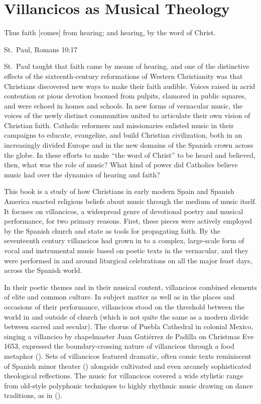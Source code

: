 
\chapter{Villancicos as Musical Theology}

\epigraph{%

Thus faith [comes] from hearing; and hearing, by the word of Christ.%
}{St.~Paul, Romans 10:17}


St.~Paul taught that faith came by means of hearing, and one of the distinctive effects of the sixteenth-century reformations of Western Christianity was that Christians discovered new ways to make their faith audible.
Voices raised in acrid contention or pious devotion boomed from pulpits, clamored in public squares, and were echoed in homes and schools.
In new forms of vernacular music, the voices of the newly distinct communities united to articulate their own vision of Christian faith.
Catholic reformers and missionaries enlisted music in their campaigns to educate, evangelize, and build Christian civilization, both in an increasingly divided Europe and in the new domains of the Spanish crown across the globe. 
In these efforts to make \enquote{the word of Christ} to be heard and believed, then, what was the role of music?
What kind of power did Catholics believe music had over the dynamics of hearing and faith?

This book is a study of how Christians in early modern Spain and Spanish America enacted religious beliefs about music through the medium of music itself.
It focuses on villancicos, a widespread genre of devotional poetry and musical performance, for two primary reasons.
First, these pieces were actively employed by the Spanish church and state as tools for propagating faith.
By the seventeenth century villancicos had grown in to a complex, large-scale form of vocal and instrumental music based on poetic texts in the vernacular, and they were performed in and around liturgical celebrations on all the major feast days, across the Spanish world.

In their poetic themes and in their musical content, villancicos combined elements of elite and common culture. 
In subject matter as well as in the places and occasions of their performance, villancicos stood on the threshold between the world in and outside of church (which is not quite the same as a modern divide between sacred and secular). 
The chorus of Puebla Cathedral in colonial Mexico, singing a villancico by chapelmaster Juan Gutiérrez de Padilla on Christmas Eve 1653, expressed the boundary-crossing nature of villancicos through a food metaphor ().
Sets of villancicos featured dramatic, often comic texts reminiscent of Spanish minor theater () alongside cultivated and even arcanely sophisticated theological reflections.
The music for villancicos covered a wide stylistic range from old-style polyphonic techniques to highly rhythmic music drawing on dance traditions, as in  ().


